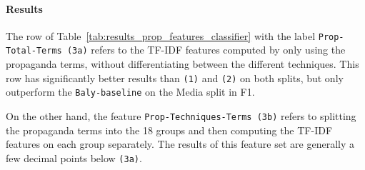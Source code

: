 \paragraph{Results}

The row of Table~\ref{tab:results_prop_features_classifier} with the label \texttt{Prop-Total-Terms (3a)} refers to the TF-IDF features computed by only using the propaganda terms, without differentiating between the different techniques.
This row has significantly better results than \texttt{(1)} and \texttt{(2)} on both splits, but only outperform the \texttt{Baly-baseline}  on the Media split in F1. %

On the other hand, the feature \texttt{Prop-Techniques-Terms (3b)} refers to splitting the propaganda terms into the 18 groups and then computing the TF-IDF features on each group separately. The results of this feature set are generally a few decimal points below \texttt{(3a)}.





